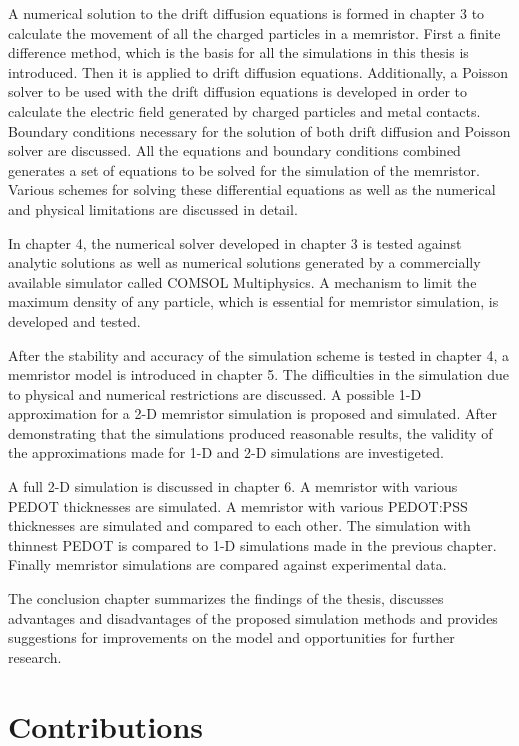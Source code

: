 \begin{doublespace}
A numerical solution to the drift diffusion equations is formed in chapter 3 to calculate the movement of all the charged particles in a memristor. First a finite difference method, which is the basis for all the simulations in this thesis is introduced. Then it is applied to drift diffusion equations. Additionally, a Poisson solver to be used with the drift diffusion equations is developed in order to calculate the electric field generated by charged particles and metal contacts. Boundary conditions necessary for the solution of both drift diffusion and Poisson solver are discussed. All the equations and boundary conditions combined generates a set of equations to be solved for the simulation of the memristor. Various schemes for solving these differential equations as well as the numerical and physical limitations are discussed in detail.
 
In chapter 4, the numerical solver developed in chapter 3 is tested against analytic solutions as well as numerical solutions generated by a commercially available simulator called COMSOL Multiphysics. A mechanism to limit the maximum density of any particle, which is essential for memristor simulation, is developed and tested. 

After the stability and accuracy of the simulation scheme is tested in chapter 4, a memristor model is introduced in chapter 5. The difficulties in the simulation due to physical and numerical restrictions are discussed. A possible 1-D approximation for a 2-D memristor simulation is proposed and simulated. After demonstrating that the simulations produced reasonable results, the validity of the approximations made for 1-D and 2-D simulations are investigeted.  

A full 2-D simulation is discussed in chapter 6. A memristor with various PEDOT thicknesses are simulated. A memristor with various PEDOT:PSS thicknesses are simulated and compared to each other. The simulation with thinnest PEDOT is compared to 1-D simulations made in the previous chapter. Finally memristor simulations are compared against experimental data.

The conclusion chapter summarizes the findings of the thesis, discusses advantages and disadvantages of the proposed simulation methods and provides suggestions for improvements on the model and opportunities for further research.

\section{Contributions}



\end{doublespace}
